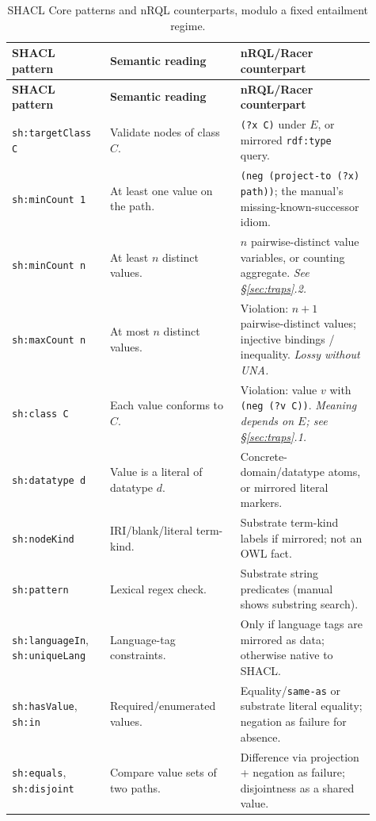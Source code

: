 \documentclass[11pt,letterpaper]{article}
\theoremstyle{definition}
\newcommand{\shacl}{SHACL}
\newcommand{\naf}{negation as failure}
\newcommand{\owl}{OWL}
\begin{document}
\begin{longtable}{p{0.24\linewidth}p{0.33\linewidth}p{0.34\linewidth}}
\caption{SHACL Core patterns and nRQL counterparts, modulo a fixed entailment regime.}\label{tab:translation}\\
\toprule
\textbf{SHACL pattern} & \textbf{Semantic reading} & \textbf{nRQL/Racer counterpart} \\
\midrule
\endfirsthead
\toprule
\textbf{SHACL pattern} & \textbf{Semantic reading} & \textbf{nRQL/Racer counterpart} \\
\midrule
\endhead
\bottomrule
\endfoot
\texttt{sh:targetClass C} & Validate nodes of class $C$. & \texttt{(?x C)} under $E$, or mirrored \texttt{rdf:type} query. \\
\addlinespace
\texttt{sh:minCount 1} & At least one value on the path. & \texttt{(neg (project-to (?x) path))}; the manual's missing-known-successor idiom. \\
\addlinespace
\texttt{sh:minCount n} & At least $n$ distinct values. & $n$ pairwise-distinct value variables, or counting aggregate. \emph{See \S\ref{sec:traps}.2.} \\
\addlinespace
\texttt{sh:maxCount n} & At most $n$ distinct values. & Violation: $n{+}1$ pairwise-distinct values; injective bindings / inequality. \emph{Lossy without UNA.} \\
\addlinespace
\texttt{sh:class C} & Each value conforms to $C$. & Violation: value $v$ with \texttt{(neg (?v C))}. \emph{Meaning depends on $E$; see \S\ref{sec:traps}.1.} \\
\addlinespace
\texttt{sh:datatype d} & Value is a literal of datatype $d$. & Concrete-domain/datatype atoms, or mirrored literal markers. \\
\addlinespace
\texttt{sh:nodeKind} & IRI/blank/literal term-kind. & Substrate term-kind labels if mirrored; not an \owl{} fact. \\
\addlinespace
\texttt{sh:pattern} & Lexical regex check. & Substrate string predicates (manual shows substring search). \\
\addlinespace
\texttt{sh:languageIn}, \texttt{sh:uniqueLang} & Language-tag constraints. & Only if language tags are mirrored as data; otherwise native to \shacl{}. \\
\addlinespace
\texttt{sh:hasValue}, \texttt{sh:in} & Required/enumerated values. & Equality/\texttt{same-as} or substrate literal equality; \naf{} for absence. \\
\addlinespace
\texttt{sh:equals}, \texttt{sh:disjoint} & Compare value sets of two paths. & Difference via projection + \naf{}; disjointness as a shared value. \\

\end{longtable}
\end{document}
